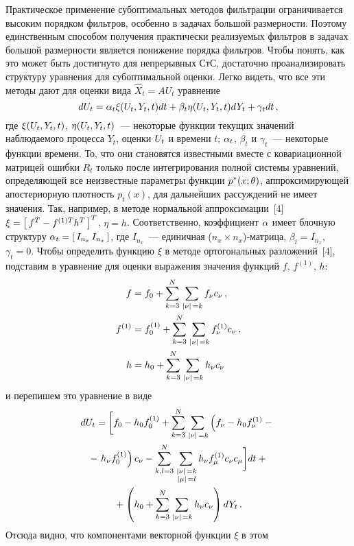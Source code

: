 \begin{multicols}{2}
Практическое применение субоптимальных методов 
фильтрации ограничивается высоким порядком фильтров, особенно в
задачах большой размерности. Поэтому единственным способом
получения практически реализу\-емых фильтров в задачах большой
размерности является понижение порядка фильтров. Чтобы понять, как
это может быть достигнуто для непрерывных СтС, достаточно
проанализировать структуру уравнения для субоптимальной оценки.
Легко видеть, что все эти методы дают для оценки  вида
$\hat X_t= AU_t$ уравнение 
\begin{equation}
dU_t =\alpha_t \xi (U_t,Y_t, t) dt + \beta_t\eta (U_t,Y_t, t) dY_t +
    \gamma_t dt\,,
\end{equation}
где  $\xi (U_t,Y_t, t)$, $\eta(U_t,Y_t, t)$~--- некоторые функции текущих
значений наблюдаемого процесса $Y_t$, оценки $U_t$ и времени $t$;
$\alpha_t$, $\beta_t$ и  $\gamma_t$~--- некоторые функции времени.
То, что они становятся известными вмес\-те с ковариационной матрицей
ошибки $R_t$ только после интегрирования полной системы уравнений,
определяющей все неизвестные параметры функции $p^*(x;\theta)$,
аппроксимирующей апостериорную плотность $p_t(x)$, для дальнейших
рассуждений не имеет значения. Так, например, в методе нормальной
аппроксимации~[4] $\xi = \left[\, f^T - f^{(1)T} h^T\,\right]^T$, $\eta=h$.
Соответственно, коэффициент $\alpha$ имеет блочную структуру
$\alpha_t=\left[\, I_{n_x}\,I_{n_x}\,\right]$, где  $I_{n_x}$~--- единичная
(${n_x}\times {n_x}$)-матрица,  $\beta_t = I_{n_x}$, $\gamma_t=0$. Чтобы
определить функцию $\xi$ в методе ортогональных разложений~[4],
подставим в уравнение для оценки выражения значения функций  $f$, $f^{(1)}$, $h$:
\begin{align*}
f&= f_0 +\sum\limits_{k=3}^N \sum\limits_{\,\left\vert\nu\right\vert\,=k} f_\nu c_\nu\,,\\
f^{(1)} &= f_0^{(1)} +\sum\limits_{k=3}^N \sum\limits_{\,\left\vert\nu\right\vert\,=k} f_\nu^{(1)} c_\nu\,,\\
h&= h_0 +\sum\limits_{k=3}^N \sum\limits_{\,\left\vert\nu\right\vert\,=k} h_\nu c_\nu
\end{align*}
 и перепишем это уравнение в виде
\begin{multline*}
dU_t =\biggl[ f_0 - h_0 f_0^{(1)}  +\sum\limits_{k=3}^N \sum\limits_{\,\left\vert\nu\right\vert\,=k} \left (
f_\nu - h_0 f_\nu^{(1)} -{}\right.\\
{}-\left. h_\nu f_0^{(1)}\right ) c_\nu - \sum\limits_{k,l=3}^N
\sum\limits_{\substack{\,\left\vert\nu\right\vert\,=k\\ \,\left\vert\mu\right\vert\,=l}} h_\nu f_\mu^{(1)}
c_\nu c_\mu\biggr] dt +{}\\
{}+     \left( h_0 +\sum\limits_{k=3}^N \sum\limits_{\,\left\vert\nu\right\vert\,=k} h_\nu c_\nu\right) dY_t\,.
\end{multline*}
Отсюда видно, что компонентами векторной функции  $\xi$ в этом

\end{multicols}
